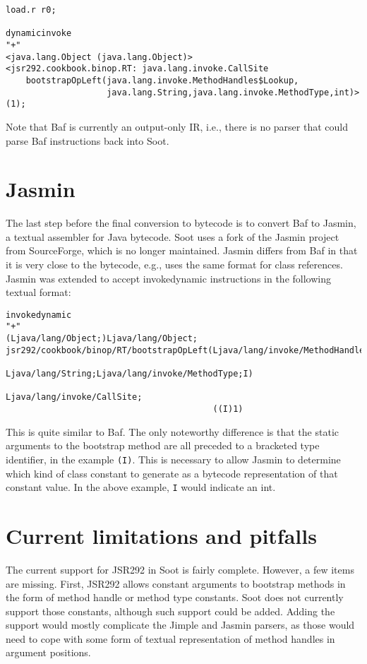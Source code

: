 \documentclass{article}
\begin{document}
\begin{verbatim}
load.r r0;

dynamicinvoke
"+"
<java.lang.Object (java.lang.Object)>
<jsr292.cookbook.binop.RT: java.lang.invoke.CallSite
    bootstrapOpLeft(java.lang.invoke.MethodHandles$Lookup,
                    java.lang.String,java.lang.invoke.MethodType,int)>(1);
\end{verbatim}

Note that Baf is currently an output-only IR, i.e., there is no parser that
could parse Baf instructions back into Soot.

\section{Jasmin}
The last step before the final conversion to bytecode is to convert Baf to
Jasmin, a textual assembler for Java bytecode. Soot uses a fork of the Jasmin
project from SourceForge, which is no longer maintained. Jasmin differs
from Baf in that it is very close to the bytecode, e.g., uses the same
format for class references. Jasmin was extended to accept invokedynamic
instructions in the following textual format:

\begin{verbatim}
invokedynamic
"+"
(Ljava/lang/Object;)Ljava/lang/Object;
jsr292/cookbook/binop/RT/bootstrapOpLeft(Ljava/lang/invoke/MethodHandles$Lookup;
                                         Ljava/lang/String;Ljava/lang/invoke/MethodType;I)
                                            Ljava/lang/invoke/CallSite;
                                         ((I)1)
\end{verbatim}

This is quite similar to Baf. The only noteworthy difference is that the
static arguments to the bootstrap method are all preceded to a bracketed type
identifier, in the example \texttt{(I)}. This is necessary to allow Jasmin to
determine which kind of class constant to generate as a bytecode representation
of that constant value. In the above example, \texttt{I} would indicate an int.

\section{Current limitations and pitfalls}
The current support for JSR292 in Soot is fairly complete. However, a few items
are missing. First, JSR292 allows constant arguments to bootstrap methods in the
form of method handle or method type constants. Soot does not currently support
those constants, although such support could be added. Adding the support would
mostly complicate the Jimple and Jasmin parsers, as those would need to cope
with some form of textual representation of method handles in argument
positions.
\end{document}
